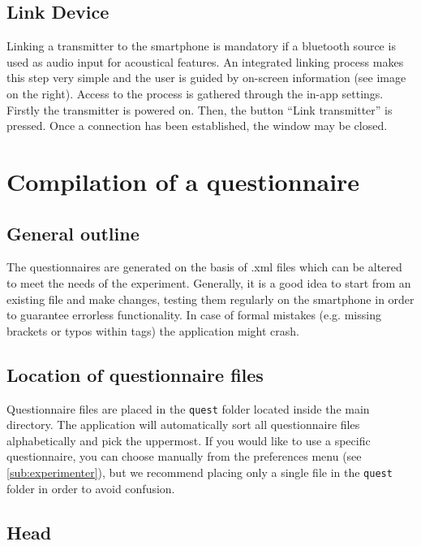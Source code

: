 \documentclass[11pt,a4paper,titlepage]{article}
\begin{document}
\subsection{Link Device}\label{sub:linkdevice}

Linking a transmitter to the smartphone is mandatory if a bluetooth source is used as audio input for acoustical features. An integrated linking process makes this step very simple and the user is guided by on-screen information (see image on the right). Access to the process is gathered through the in-app settings. Firstly the transmitter is powered on. Then, the button ``Link transmitter'' is pressed. Once a connection has been established, the window may be closed.



\section{Compilation of a questionnaire}


\subsection{General outline}

The questionnaires are generated on the basis of .xml files which can be altered to meet the needs of the experiment. Generally, it is a good idea to start from an existing file and make changes, testing them regularly on the smartphone in order to guarantee errorless functionality. In case of formal mistakes (e.g. missing brackets or typos within tags) the application might crash. 


\subsection{Location of questionnaire files}

Questionnaire files are placed in the \texttt{quest} folder located inside the main directory. The application will automatically sort all questionnaire files alphabetically and pick the uppermost. If you would like to use a specific questionnaire, you can choose manually from the preferences menu (see \ref{sub:experimenter}), but we recommend placing only a single file in the \texttt{quest} folder in order to avoid confusion. 


\subsection{Head}
\end{document}
